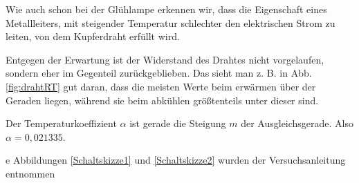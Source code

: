 \documentclass[11pt,a4paper,titlepage, ngerman]{article}
\begin{document}
			Wie auch schon bei der Glühlampe erkennen wir, dass die Eigenschaft eines Metallleiters, mit steigender Temperatur schlechter den elektrischen Strom zu leiten, von dem Kupferdraht erfüllt wird.
			
			Entgegen der Erwartung ist der Widerstand des Drahtes nicht vorgelaufen, sondern eher im Gegenteil zurückgeblieben.
			Das sieht man z. B. in {Abb. \ref{fig:drahtRT}} gut daran, dass die meisten Werte beim erwärmen über der Geraden liegen, während sie beim abkühlen größtenteils unter dieser sind.
			
			Der Temperaturkoeffizient $\alpha$ ist gerade die Steigung $m$ der Ausgleichsgerade.
			Also $\alpha = 0,021335$.
		
	\begin{thebibliography}	
		e Abbildungen \ref{Schaltskizze1} und \ref{Schaltskizze2} wurden der Versuchsanleitung entnommen
	\end{thebibliography}	
			
\end{document}
